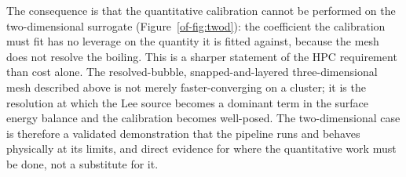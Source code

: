 \documentclass[11pt]{article}
\begin{document}
The consequence is that the quantitative calibration cannot be performed on the two-dimensional
surrogate (Figure~\ref{of-fig:twod}): the coefficient the calibration must fit has no leverage on the quantity it is fitted
against, because the mesh does not resolve the boiling. This is a sharper statement of the HPC
requirement than cost alone. The resolved-bubble, snapped-and-layered three-dimensional mesh
described above is not merely faster-converging on a cluster; it is the resolution at which the
Lee source becomes a dominant term in the surface energy balance and the calibration becomes
well-posed. The two-dimensional case is therefore a validated demonstration that the pipeline
runs and behaves physically at its limits, and direct evidence for where the quantitative work
must be done, not a substitute for it.
\end{document}
